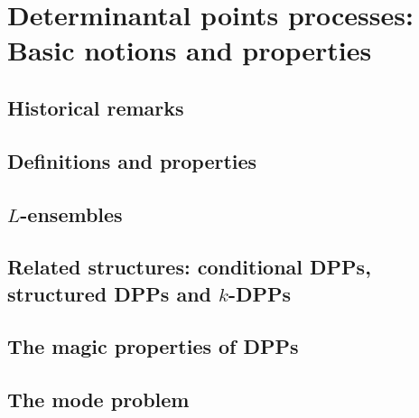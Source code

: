 \chapter{Determinantal points processes: Basic notions and properties}

\section{Historical remarks}

\section{Definitions and properties}

\section{\(L\)-ensembles}

\section{Related structures: conditional DPPs, structured DPPs and \(k\)-DPPs}

\section{The magic properties of DPPs}

\section{The mode problem}